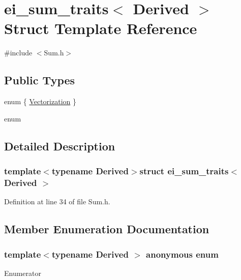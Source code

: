 \hypertarget{structei__sum__traits}{\section{ei\-\_\-sum\-\_\-traits$<$ Derived $>$ Struct Template Reference}
\label{structei__sum__traits}
}


{\ttfamily \#include $<$Sum.\-h$>$}

\subsection*{Public Types}
\begin{DoxyCompactItemize}
\item 
enum \{ \hyperlink{structei__sum__traits_a96e8056956ab391fcffd74ef7be31feea72057eaf5081f013edd463f5a334cab8}{Vectorization}
 \}
\item 
enum 
\end{DoxyCompactItemize}


\subsection{Detailed Description}
\subsubsection*{template$<$typename Derived$>$struct ei\-\_\-sum\-\_\-traits$<$ Derived $>$}



Definition at line 34 of file Sum.\-h.



\subsection{Member Enumeration Documentation}
\hypertarget{structei__sum__traits_a96e8056956ab391fcffd74ef7be31fee}{\subsubsection[{anonymous enum}]{\setlength{\rightskip}{0pt plus 5cm}template$<$typename Derived $>$ anonymous enum}}\label{structei__sum__traits_a96e8056956ab391fcffd74ef7be31fee}
\begin{Desc}
\item[Enumerator]\par
\begin{description}
\item[{\em 
\hypertarget{structei__sum__traits_a96e8056956ab391fcffd74ef7be31feea72057eaf5081f013edd463f5a334cab8}{Vectorization}\label{structei__sum__traits_a96e8056956ab391fcffd74ef7be31feea72057eaf5081f013edd463f5a334cab8}
}]\end{description}
\end{Desc}


